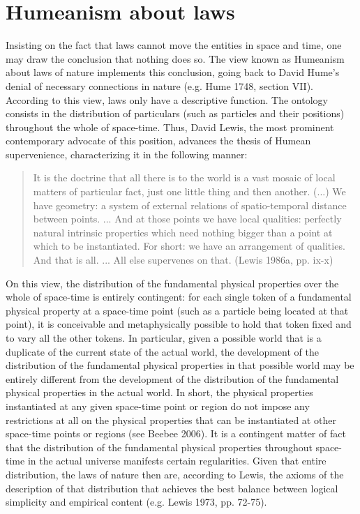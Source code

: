 \documentclass[12pt,a4paper]{article}
\theoremstyle{definition}
\begin{document}
\section{Humeanism about laws}
Insisting on the fact that laws cannot move the entities in space and time, one may draw the conclusion that nothing does so. The view known as Humeanism about laws of nature implements this conclusion, going back to David Hume's denial of necessary connections in nature (e.g. Hume 1748, section VII). According to this view, laws only have a descriptive function. The ontology consists in the distribution of particulars (such as particles and their positions) throughout the whole of space-time. Thus, David Lewis, the most prominent contemporary advocate of this position, advances the thesis of Humean supervenience, characterizing it in the following manner:

\begin{quote} It is the doctrine that all there is to the world is a vast mosaic of local matters of particular fact, just one little thing and then another. (...) We have geometry: a system of external relations of spatio-temporal distance between points. ... And at those points we have local qualities: perfectly natural intrinsic properties which need nothing bigger than a point at which to be instantiated. For short: we have an arrangement of qualities. And that is all. ... All else supervenes on that. (Lewis 1986a, pp. ix-x)\end{quote}

\noindent On this view, the distribution of the fundamental physical properties over the whole of space-time is entirely contingent: for each single token of a fundamental physical property at a space-time point (such as a particle being located at that point), it is conceivable and metaphysically possible to hold that token fixed and to vary all the other tokens. In particular, given a possible world that is a duplicate of the current state of the actual world, the development of the distribution of the fundamental physical properties in that possible world may be entirely different from the development of the distribution of the fundamental physical properties in the actual world. In short, the physical properties instantiated at any given space-time point or region do not impose any restrictions at all on the physical properties that can be instantiated at other space-time points or regions (see Beebee 2006). It is a contingent matter of fact that the distribution of the fundamental physical properties throughout space-time in the actual universe manifests certain regularities. Given that entire distribution, the laws of nature then are, according to Lewis, the axioms of the description of that distribution that achieves the best balance between logical simplicity and empirical content (e.g. Lewis 1973, pp. 72-75).
\end{document}
